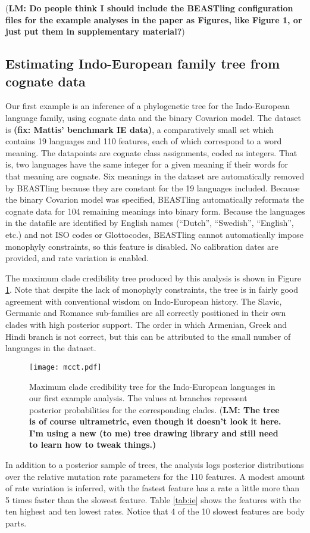 \documentclass[twocolumn,10pt]{scrartcl}
\begin{document}
(\textbf{LM: Do people think I should include the BEASTling configuration files for the example analyses in the paper as Figures, like Figure 1, or just put them in supplementary material?})

\subsection{Estimating Indo-European family tree from cognate data}

Our first example is an inference of a phylogenetic tree for the Indo-European language family, using cognate data and the binary Covarion model.  The dataset is \textbf{(fix: Mattis' benchmark IE data)}, a comparatively small set which contains 19 languages and 110 features, each of which correspond to a word meaning.  The datapoints are cognate class assignments, coded as integers.  That is, two languages have the same integer for a given meaning if their words for that meaning are cognate.  Six meanings in the dataset are automatically removed by BEASTling because they are constant for the 19 languages included.  Because the binary Covarion model was specified, BEASTling automatically reformats the cognate data for 104 remaining meanings into binary form.  Because the languages in the datafile are identified by English names (``Dutch'', ``Swedish'', ``English'', etc.) and not ISO codes or Glottocodes, BEASTling cannot automatically impose monophyly constraints, so this feature is disabled.  No calibration dates are provided, and rate variation is enabled.

The maximum clade credibility tree produced by this analysis is shown in Figure \ref{fig:ie}.  Note that despite the lack of monophyly constraints, the tree is in fairly good agreement with conventional wisdom on Indo-European history.  The Slavic, Germanic and Romance sub-families are all correctly positioned in their own clades with high posterior support.  The order in which Armenian, Greek and Hindi branch is not correct, but this can be attributed to the small number of languages in the dataset.

\begin{figure}[t]
	\texttt{[image: mcct.pdf]}
	\caption{Maximum clade credibility tree for the Indo-European languages in our first example analysis.  The values at branches represent posterior probabilities for the corresponding clades. (\textbf{LM: The tree is of course ultrametric, even though it doesn't look it here.  I'm using a new (to me) tree drawing library and still need to learn how to tweak things.)}}
\label{fig:ie}
\end{figure}
In addition to a posterior sample of trees, the analysis logs posterior distributions over the relative mutation rate parameters for the 110 features.  A modest amount of rate variation is inferred, with the fastest feature has a rate a little more than 5 times faster than the slowest feature.  Table \ref{tab:ie} shows the features with the ten highest and ten lowest rates.  Notice that 4 of the 10 slowest features are body parts.
\end{document}
